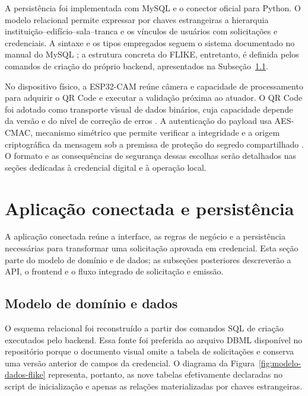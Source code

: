 A persistência foi implementada com MySQL e o conector oficial para Python. O modelo relacional permite expressar por chaves estrangeiras a hierarquia instituição--edifício--sala--tranca e os vínculos de usuários com solicitações e credenciais. A sintaxe e os tipos empregados seguem o sistema documentado no manual do MySQL \cite{oracle2026mysql84}; a estrutura concreta do FLIKE, entretanto, é definida pelos comandos de criação do próprio backend, apresentados na Subseção~\ref{subsec:modelo-dados}.

No dispositivo físico, a ESP32-CAM reúne câmera e capacidade de processamento para adquirir o QR Code e executar a validação próxima ao atuador. O QR Code foi adotado como transporte visual de dados binários, cuja capacidade depende da versão e do nível de correção de erros \cite{denso2012qressentials}. A autenticação do payload usa AES-CMAC, mecanismo simétrico que permite verificar a integridade e a origem criptográfica da mensagem sob a premissa de proteção do segredo compartilhado \cite{nist2005cmac}. O formato e as consequências de segurança dessas escolhas serão detalhados nas seções dedicadas à credencial digital e à operação local.

\section{Aplicação conectada e persistência}

A aplicação conectada reúne a interface, as regras de negócio e a persistência necessárias para transformar uma solicitação aprovada em credencial. Esta seção parte do modelo de domínio e de dados; as subseções posteriores descreverão a API, o frontend e o fluxo integrado de solicitação e emissão.

\subsection{Modelo de domínio e dados} \label{subsec:modelo-dados}

O esquema relacional foi reconstruído a partir dos comandos SQL de criação executados pelo backend. Essa fonte foi preferida ao arquivo DBML disponível no repositório porque o documento visual omite a tabela de solicitações e conserva uma versão anterior de campos da credencial. O diagrama da Figura~\ref{fig:modelo-dados-flike} representa, portanto, as nove tabelas efetivamente declaradas no script de inicialização e apenas as relações materializadas por chaves estrangeiras.

